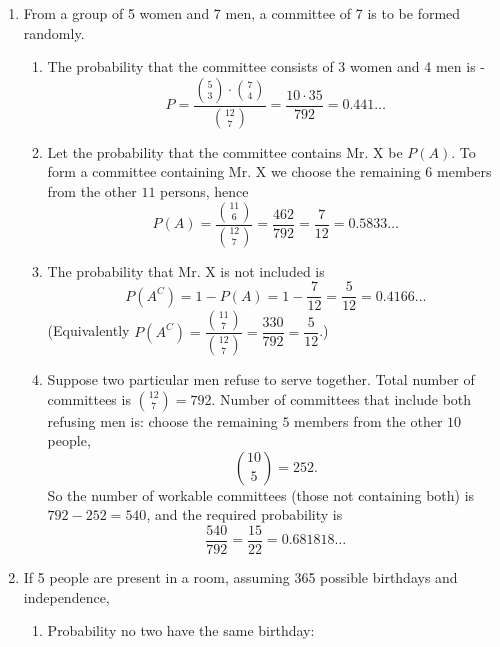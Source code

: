 
\setcounter{chapter}{0}

\chapter{}
\begin{enumerate}
    \item From a group of 5 women and 7 men, a committee of 7 is to be formed randomly.
    \begin{enumerate}
        \item The probability that the committee consists of 3 women and 4 men is -
        $$P = \frac{\binom{5}{3}\cdot\binom{7}{4}}{\binom{12}{7}} = \frac{10\cdot 35}{792} = 0.441\ldots$$
        \item Let the probability that the committee contains Mr. X be $P(A)$. To form a committee containing Mr. X we choose the remaining $6$ members from the other $11$ persons, hence
        $$P(A)=\frac{\binom{11}{6}}{\binom{12}{7}}=\frac{462}{792}=\frac{7}{12}=0.5833\ldots$$
        \item The probability that Mr. X is not included is
        $$P(A^C)=1-P(A)=1-\frac{7}{12}=\frac{5}{12}=0.4166\ldots$$
        (Equivalently $P(A^C)=\dfrac{\binom{11}{7}}{\binom{12}{7}}=\dfrac{330}{792}=\dfrac{5}{12}$.)
        \item Suppose two particular men refuse to serve together. Total number of committees is $\binom{12}{7}=792$. Number of committees that include both refusing men is: choose the remaining $5$ members from the other $10$ people,
        $$\binom{10}{5}=252.$$
        So the number of workable committees (those not containing both) is $792-252=540$, and the required probability is
        $$\frac{540}{792}=\frac{15}{22}=0.681818\ldots$$
    \end{enumerate}
    \item If 5 people are present in a room, assuming 365 possible birthdays and independence,
    \begin{enumerate}
        \item Probability no two have the same birthday:

\end{enumerate}
\end{enumerate}
